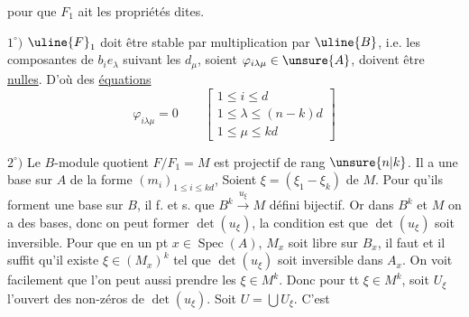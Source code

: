 pour que $F_1$ ait les propriétés dites. 

$1^\circ)$ $\uline{F}_1$ doit être stable par multiplication par $\uline{B}$, i.e.  les composantes de $b_i e_\lambda$ suivant les $d_\mu$, soient $\varphi_{i\lambda\mu}\in\unsure{A}$, doivent être \uline{nulles}. D'où des \uline{équations}
\[
\varphi_{i\lambda\mu}=0\qquad\left[\begin{array}{l}
1\leq i\leq d\\
1\leq\lambda\leq(n-k)d\\
1\leq\mu\leq kd
\end{array}\right]
\]

$2^\circ)$ Le $B$-module quotient  $F/F_1=M$ est projectif de rang $\unsure{n|k}$. Il a une base sur $A$ de la forme $(m_i)_{1\leq i\leq kd}$,
Soient $\xi=(\xi_1-\xi_k)$    de $M$. Pour qu'ils forment une base sur $B$, il f. et s. que $B^k\xrightarrow{u_\xi}M$ défini  bijectif. Or dans $B^k$ et $M$ on a des bases, donc on peut former $\det(u_\xi)$, la condition est que $\det(u_\xi)$ soit inversible.  Pour que en un pt $x\in\operatorname{Spec}(A)$, $M_x$ soit libre sur $B_x$, il faut et il suffit qu'il existe $\xi\in(M_x)^k$ tel que $\det(u_\xi)$ soit inversible dans $A_x$. On voit facilement que l'on peut aussi prendre les $\xi\in M^k$. Donc pour tt  $\xi\in M^k$, soit $U_\xi$ l'ouvert  des non-zéros de $\det(u_\xi)$. Soit $U=\bigcup U_\xi$. C'est
